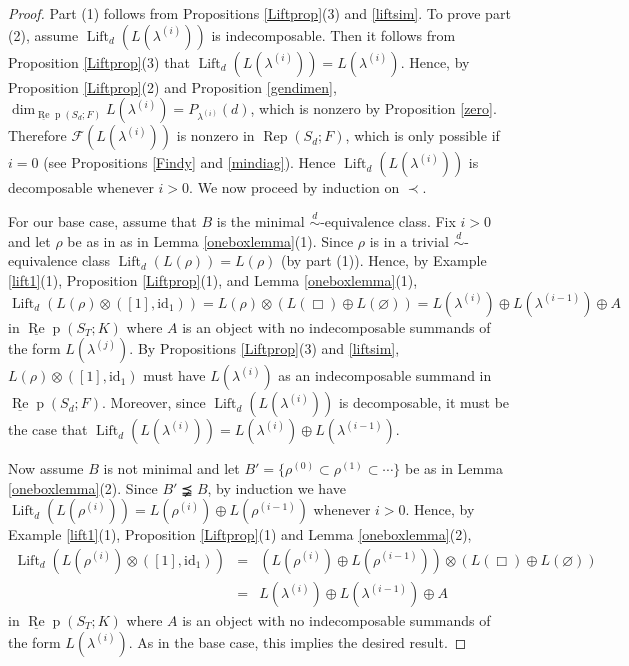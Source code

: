 \documentclass{amsart}
\theoremstyle{definition}
\newcommand{\id}{\text{id}}
\def\uRep{\underline{\operatorname{Re}}\!\operatorname{p}}
\newcommand{\Lift}{\operatorname{Lift}}
\newcommand{\Rep}{\operatorname{Rep}}
\renewcommand{\1}{_{(1)}}
\renewcommand{\2}{_{(2)}}
\newcommand{\3}{_{(3)}}
\newcommand{\4}{_{(4)}}
\newcommand{\cat}{\mathcal}
\begin{document}
\begin{proof} Part (1) follows from Propositions \ref{Liftprop}(3) and \ref{liftsim}.  To prove part (2), assume $\Lift_d(L(\lambda^{(i)}))$ is indecomposable.  Then it follows from  Proposition \ref{Liftprop}(3) that  $\Lift_d(L(\lambda^{(i)}))=L(\lambda^{(i)})$.  Hence, by Proposition \ref{Liftprop}(2) and Proposition \ref{gendimen}, $\dim_{\uRep(S_d; F)}L(\lambda^{(i)})=P_{\lambda^{(i)}}(d)$, which is nonzero by Proposition \ref{zero}.  Therefore $\cat{F}(L(\lambda^{(i)}))$ is nonzero in $\Rep(S_d; F)$, which is only possible if $i=0$ (see Propositions \ref{Findy} and  \ref{mindiag}).  Hence $\Lift_d(L(\lambda^{(i)}))$ is decomposable whenever $i>0$.  We now proceed by induction on $\prec$.  

For our base case, assume that $B$ is the minimal $\stackrel{d}{\sim}$-equivalence class.  Fix $i>0$ and let $\rho$ be as in as in Lemma \ref{oneboxlemma}(1).  Since $\rho$ is in a trivial $\stackrel{d}{\sim}$-equivalence class $\Lift_d(L(\rho))=L(\rho)$ (by part (1)).  Hence, by Example \ref{lift1}(1), Proposition \ref{Liftprop}(1), and Lemma \ref{oneboxlemma}(1), $$\Lift_d(L(\rho)\otimes([1], \id_1))=L(\rho)\otimes(L(\Box)\oplus L(\varnothing))=L(\lambda^{(i)})\oplus L(\lambda^{(i-1)})\oplus A$$ in $\uRep(S_T; K)$ where $A$ is an object with no indecomposable summands of the form $L(\lambda^{(j)})$.  By Propositions \ref{Liftprop}(3) and \ref{liftsim}, $L(\rho)\otimes([1], \id_1)$ must have $L(\lambda^{(i)})$ as an indecomposable summand in $\uRep(S_d; F)$.  Moreover, since $\Lift_d(L(\lambda^{(i)}))$ is decomposable, it must be the case that $\Lift_d(L(\lambda^{(i)}))=L(\lambda^{(i)})\oplus L(\lambda^{(i-1)})$.  

Now assume $B$ is not minimal and let $B'=\{\rho^{(0)}\subset\rho^{(1)}\subset\cdots\}$ be as in Lemma \ref{oneboxlemma}(2).  Since $B'\precneqq B$, by induction we have $\Lift_d(L(\rho^{(i)}))=L(\rho^{(i)})\oplus L(\rho^{(i-1)})$ whenever $i>0$.   Hence, by Example \ref{lift1}(1), Proposition \ref{Liftprop}(1) and Lemma \ref{oneboxlemma}(2), $$\begin{array}{rcl}\Lift_d(L(\rho^{(i)})\otimes([1], \id_1)) & = &(L(\rho^{(i)})\oplus L(\rho^{(i-1)}))\otimes(L(\Box)\oplus L(\varnothing))\\
& = & L(\lambda^{(i)})\oplus L(\lambda^{(i-1)})\oplus A\end{array}$$ in $\uRep(S_T; K)$ where $A$ is an object with no indecomposable summands of the form $L(\lambda^{(i)})$.  As in the base case, this implies the desired result.
\end{proof}
\end{document}
